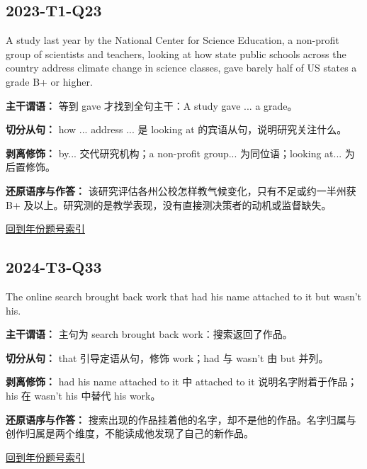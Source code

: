 \documentclass[11pt,a4paper]{article}
\begin{document}
\subsection{2023-T1-Q23}
\begin{evidence}A study last year by the National Center for Science Education, a non-profit group of scientists and teachers, looking at how state public schools across the country address climate change in science classes, gave barely half of US states a grade B+ or higher.\end{evidence}
\noindent\textbf{主干谓语：} 等到 gave 才找到全句主干：A study gave ... a grade。\par\smallskip
\noindent\textbf{切分从句：} how ... address ... 是 looking at 的宾语从句，说明研究关注什么。\par\smallskip
\noindent\textbf{剥离修饰：} by... 交代研究机构；a non-profit group... 为同位语；looking at... 为后置修饰。\par\smallskip
\noindent\textbf{还原语序与作答：} 该研究评估各州公校怎样教气候变化，只有不足或约一半州获 B+ 及以上。研究测的是教学表现，没有直接测决策者的动机或监督缺失。\par\smallskip
\hyperref[idx-2023-T1-Q23]{回到年份题号索引}\par
\clearpage
\subsection{2024-T3-Q33}
\begin{evidence}The online search brought back work that had his name attached to it but wasn’t his.\end{evidence}
\noindent\textbf{主干谓语：} 主句为 search brought back work：搜索返回了作品。\par\smallskip
\noindent\textbf{切分从句：} that 引导定语从句，修饰 work；had 与 wasn’t 由 but 并列。\par\smallskip
\noindent\textbf{剥离修饰：} had his name attached to it 中 attached to it 说明名字附着于作品；his 在 wasn’t his 中替代 his work。\par\smallskip
\noindent\textbf{还原语序与作答：} 搜索出现的作品挂着他的名字，却不是他的作品。名字归属与创作归属是两个维度，不能读成他发现了自己的新作品。\par\smallskip
\hyperref[idx-2024-T3-Q33]{回到年份题号索引}\par
\end{document}
